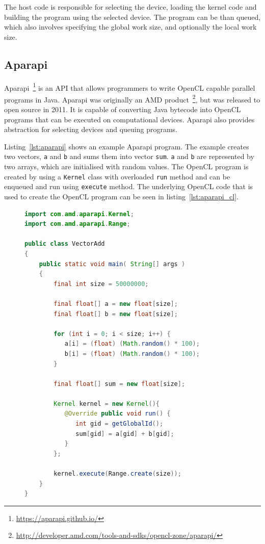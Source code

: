 \documentclass{l4proj}
\begin{document}
The host code is responsible for selecting the device, loading the kernel code and building the 
program using the selected device. The program can be than queued, which also involves specifying
the global work size, and optionally the local work size.

\subsection{Aparapi}

Aparapi~\footnote{\url{https://aparapi.github.io/}} is an API that allows programmers
to write OpenCL capable parallel programs in Java. Aparapi was originally an AMD 
product~\footnote{\url{http://developer.amd.com/tools-and-sdks/opencl-zone/aparapi/}},
but was released to open source in 2011. It is capable of converting Java bytecode
into OpenCL programs that can be executed on computational devices. Aparapi also 
provides abstraction for selecting devices and queuing programs. 

Listing~\ref{lst:aparapi} shows an example Aparapi program. The example creates two 
vectors, \texttt{a} and \texttt{b} and sums them into vector \texttt{sum}. \texttt{a} and \texttt{b}
are represented by two arrays, which are initialised with random values. The OpenCL program
is created by using a \texttt{Kernel} class with overloaded \texttt{run} method and 
can be enqueued and run using \texttt{execute} method. The underlying OpenCL code that
is used to create the OpenCL program can be seen in listing~\ref{lst:aparapi_cl}.
\begin{figure}
  \begin{lstlisting}[language=Java]
import com.amd.aparapi.Kernel;
import com.amd.aparapi.Range;

public class VectorAdd 
{
    public static void main( String[] args )
    {
        final int size = 50000000;

        final float[] a = new float[size];
        final float[] b = new float[size];

        for (int i = 0; i < size; i++) {
           a[i] = (float) (Math.random() * 100);
           b[i] = (float) (Math.random() * 100);
        }

        final float[] sum = new float[size];

        Kernel kernel = new Kernel(){
           @Override public void run() {
              int gid = getGlobalId();
              sum[gid] = a[gid] + b[gid];
           }
        };
        
        kernel.execute(Range.create(size));
    }
}    
  \end{lstlisting}
\end{figure}
\end{document}
